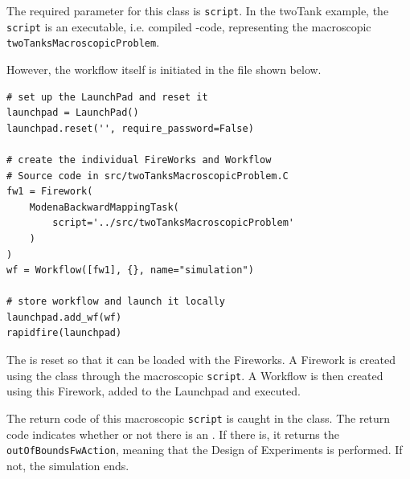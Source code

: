 The required parameter for this class is \texttt{script}. 
In the twoTank example, the \texttt{script} is an executable, i.e. compiled {\Clang}-code, representing the macroscopic  \texttt{twoTanksMacroscopicProblem}. 
%
\par
%
However, the workflow itself is initiated in the {\workflowfile} file shown below.
%
\begin{lstlisting}[style=lstPython, firstnumber=45]
# set up the LaunchPad and reset it
launchpad = LaunchPad()
launchpad.reset('', require_password=False)

# create the individual FireWorks and Workflow
# Source code in src/twoTanksMacroscopicProblem.C
fw1 = Firework(
    ModenaBackwardMappingTask(
        script='../src/twoTanksMacroscopicProblem'
    )
)
wf = Workflow([fw1], {}, name="simulation")

# store workflow and launch it locally
launchpad.add_wf(wf)
rapidfire(launchpad)
\end{lstlisting}
%
The {\LaunchPad} is reset so that it can be loaded with the Fireworks.
A Firework is created using the {\ModenaBackwardMappingTask} class through the macroscopic \texttt{script}.
A Workflow is then created using this Firework, added to the \textsf{Launchpad} and executed.
%
\par
%
The return code of this macroscopic \texttt{script} is caught in the {\ModenaBackwardMappingTask} class.
The return code indicates whether or not there is an {\outsidePoint}.
If there is, it returns the \texttt{outOfBoundsFwAction}, meaning that the Design of Experiments is performed.
If not, the simulation ends.
